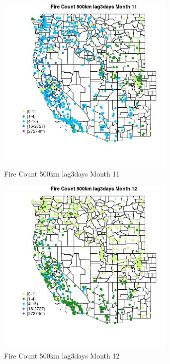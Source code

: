 \begin{figure} 
\centering  
\includegraphics[width=0.77\textwidth]{Code_Outputs/Report_ML_input_PM25_Step4_part_f_de_duplicated_aveswNAs_MapObsMo11Fire_Count_500km_lag3days.jpg} 
\caption{\label{fig:Report_ML_input_PM25_Step4_part_f_de_duplicated_aveswNAsMapObsMo11Fire_Count_500km_lag3days}Fire Count 500km lag3days Month 11} 
\end{figure} 
 

\begin{figure} 
\centering  
\includegraphics[width=0.77\textwidth]{Code_Outputs/Report_ML_input_PM25_Step4_part_f_de_duplicated_aveswNAs_MapObsMo12Fire_Count_500km_lag3days.jpg} 
\caption{\label{fig:Report_ML_input_PM25_Step4_part_f_de_duplicated_aveswNAsMapObsMo12Fire_Count_500km_lag3days}Fire Count 500km lag3days Month 12} 
\end{figure} 
 

